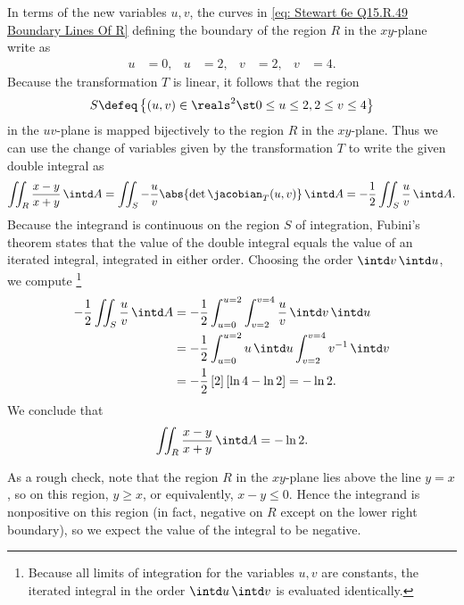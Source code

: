 {In terms of the new variables $u,v$, the curves in \eqref{eq: Stewart 6e Q15.R.49 Boundary Lines Of R} defining the boundary of the region $R$ in the $x y$-plane write as
\begin{align*}
u
&=
0,
&
u
&=
2,
&
v
&=
2,
&
v
&=
4.
\end{align*}
Because the transformation $T$ is linear, it follows that the region
\begin{align*}
S
\defeq
\left\{(u,v) \in \reals^{2} \st 0 \leq u \leq 2,2 \leq v \leq 4\right\}
\end{align*}
in the $u v$-plane is mapped bijectively to the region $R$ in the $x y$-plane. Thus we can use the change of variables given by the transformation $T$ to write the given double integral as
\begin{align*}
\iint_{R} \frac{x - y}{x + y} \, \intd A
=
\iint_{S} -\frac{u}{v} \abs{\det \jacobian_{T}(u,v)} \, \intd A
=
-\frac{1}{2} \iint_{S} \frac{u}{v} \, \intd A.
\end{align*}
Because the integrand is continuous on the region $S$ of integration, Fubini's theorem states that the value of the double integral equals the value of an iterated integral, integrated in either order. Choosing the order $\intd v \, \intd u$, we compute%
\footnote{Because all limits of integration for the variables $u,v$ are constants, the iterated integral in the order $\intd u \, \intd v$ is evaluated identically.}%
\begin{align*}
-\frac{1}{2} \iint_{S} \frac{u}{v} \, \intd A
&=
-\frac{1}{2} \int_{u = 0}^{u = 2} \int_{v = 2}^{v = 4} \frac{u}{v} \, \intd v \, \intd u
\\
&=
-\frac{1}{2} \int_{u = 0}^{u = 2} u \, \intd u \int_{v = 2}^{v = 4} v^{-1} \, \intd v
\\
&=
-\frac{1}{2} \left[2\right] \left[\ln 4 - \ln 2\right]
=
-\ln 2.
\end{align*}
We conclude that
\begin{align*}
\iint_{R} \frac{x - y}{x + y} \, \intd A
=
-\ln 2.
\end{align*}

\begin{remark}
As a rough check, note that the region $R$ in the $x y$-plane lies above the line $y = x$, so on this region, $y \geq x$, or equivalently, $x - y \leq 0$. Hence the integrand is nonpositive on this region (in fact, negative on $R$ except on the lower right boundary), so we expect the value of the integral to be negative.
\end{remark}
}%





